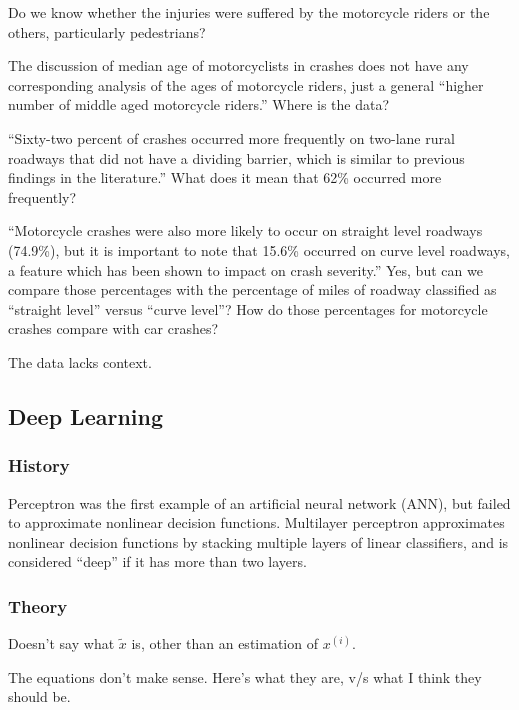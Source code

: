 \documentclass[11pt]{article}
\begin{document}
\begin{spacing}{1.2}
Do we know whether the injuries were suffered by the motorcycle riders or the others, particularly pedestrians?

The discussion of median age of motorcyclists in crashes does not have any corresponding analysis of the ages of motorcycle riders, just a general ``higher number of middle aged motorcycle riders.''  Where is the data?

``Sixty-two
percent of crashes occurred more frequently on two-lane
rural roadways that did not have a dividing barrier,
which is similar to previous findings in the literature.''  What does it mean that 62\% occurred more frequently?

``Motorcycle crashes were also more likely to occur on
straight level roadways (74.9\%), but it is important to
note that 15.6\% occurred on curve level roadways, a feature
which has been shown to impact on crash severity.''  Yes, but can we compare those percentages with the percentage of miles of roadway classified as ``straight level'' versus ``curve level''?  How do those percentages for motorcycle crashes compare with car crashes?  

The data lacks context.  

\subsection{Deep Learning}

\subsubsection{History}

Perceptron was the first example of an artificial neural network (ANN), but failed to approximate nonlinear decision functions.  Multilayer perceptron approximates nonlinear decision functions by stacking multiple layers of linear classifiers, and is considered ``deep'' if it has more than two layers.  

\subsubsection{Theory}

Doesn't say what $\tilde{x}$ is, other than an estimation of $x^{(i)}$.

The equations don't make sense.  Here's what they are, v/s what I think they should be.  


\end{spacing}
\end{document}
